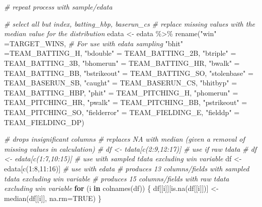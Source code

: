 \documentclass[
]{article}
\newenvironment{Shaded}{\begin{snugshade}}{\end{snugshade}}
\newcommand{\AttributeTok}[1]{\textcolor[rgb]{0.77,0.63,0.00}{#1}}
\newcommand{\CommentTok}[1]{\textcolor[rgb]{0.56,0.35,0.01}{\textit{#1}}}
\newcommand{\ConstantTok}[1]{\textcolor[rgb]{0.00,0.00,0.00}{#1}}
\newcommand{\ControlFlowTok}[1]{\textcolor[rgb]{0.13,0.29,0.53}{\textbf{#1}}}
\newcommand{\DecValTok}[1]{\textcolor[rgb]{0.00,0.00,0.81}{#1}}
\newcommand{\FunctionTok}[1]{\textcolor[rgb]{0.00,0.00,0.00}{#1}}
\newcommand{\NormalTok}[1]{#1}
\newcommand{\OtherTok}[1]{\textcolor[rgb]{0.56,0.35,0.01}{#1}}
\newcommand{\SpecialCharTok}[1]{\textcolor[rgb]{0.00,0.00,0.00}{#1}}
\newcommand{\StringTok}[1]{\textcolor[rgb]{0.31,0.60,0.02}{#1}}
\begin{document}
\begin{Shaded}
\begin{Highlighting}[]
\CommentTok{\# repeat process with sample/edata}

\CommentTok{\# select all but index, batting\_hbp, baserun\_cs}
\CommentTok{\# replace missing values with the median value for the distribution}
\NormalTok{edata }\OtherTok{\textless{}{-}}\NormalTok{ edata }\SpecialCharTok{\%\textgreater{}\%}
  \FunctionTok{rename}\NormalTok{(}\StringTok{"win"} \OtherTok{=}\NormalTok{TARGET\_WINS, }\CommentTok{\# For use with edata sampling}
        \StringTok{"bhit"} \OtherTok{=}\NormalTok{TEAM\_BATTING\_H, }
        \StringTok{"bdouble"}  \OtherTok{=}\NormalTok{ TEAM\_BATTING\_2B, }
        \StringTok{"btriple"}  \OtherTok{=}\NormalTok{ TEAM\_BATTING\_3B, }
        \StringTok{"bhomerun"}  \OtherTok{=}\NormalTok{ TEAM\_BATTING\_HR, }
        \StringTok{"bwalk"}  \OtherTok{=}\NormalTok{ TEAM\_BATTING\_BB, }
        \StringTok{"bstrikeout"}  \OtherTok{=}\NormalTok{ TEAM\_BATTING\_SO, }
        \StringTok{"stolenbase"}  \OtherTok{=}\NormalTok{ TEAM\_BASERUN\_SB, }
        \StringTok{"caught"}  \OtherTok{=}\NormalTok{ TEAM\_BASERUN\_CS, }
        \StringTok{"bhitbyp"}  \OtherTok{=}\NormalTok{ TEAM\_BATTING\_HBP, }
        \StringTok{"phit"}  \OtherTok{=}\NormalTok{ TEAM\_PITCHING\_H, }
        \StringTok{"phomerun"}  \OtherTok{=}\NormalTok{ TEAM\_PITCHING\_HR, }
        \StringTok{"pwalk"}  \OtherTok{=}\NormalTok{ TEAM\_PITCHING\_BB, }
        \StringTok{"pstrikeout"}  \OtherTok{=}\NormalTok{ TEAM\_PITCHING\_SO, }
        \StringTok{"fielderror"}  \OtherTok{=}\NormalTok{ TEAM\_FIELDING\_E, }
        \StringTok{"fielddp"}  \OtherTok{=}\NormalTok{ TEAM\_FIELDING\_DP) }


\CommentTok{\# drops insignificant columns }
\CommentTok{\# replaces NA with median (given a removal of missing values in calculation)}
\CommentTok{\# df \textless{}{-} tdata[c(2:9,12:17)]          \# use if raw tdata}
\CommentTok{\# df \textless{}{-} edata[c(1:7,10:15)] \# use with sampled tdata excluding win variable}
\NormalTok{df }\OtherTok{\textless{}{-}}\NormalTok{ edata[}\FunctionTok{c}\NormalTok{(}\DecValTok{1}\SpecialCharTok{:}\DecValTok{8}\NormalTok{,}\DecValTok{11}\SpecialCharTok{:}\DecValTok{16}\NormalTok{)] }\CommentTok{\# use with edata }
\CommentTok{\# produces 13 columns/fields with sampled tdata excluding win variable}
\CommentTok{\# produces 15 columns/fields with raw tdata excluding win variable}
\ControlFlowTok{for}\NormalTok{ (i }\ControlFlowTok{in} \FunctionTok{colnames}\NormalTok{(df)) \{}
\NormalTok{  df[[i]][}\FunctionTok{is.na}\NormalTok{(df[[i]])] }\OtherTok{\textless{}{-}} \FunctionTok{median}\NormalTok{(df[[i]], }\AttributeTok{na.rm=}\ConstantTok{TRUE}\NormalTok{)}
\NormalTok{\}}




\end{Highlighting}
\end{Shaded}
\end{document}
